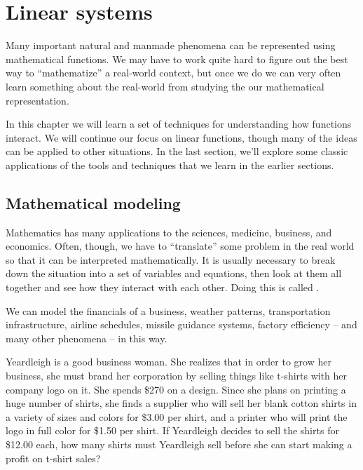 \chapter{Linear systems}
\label{ch:systems}


Many important natural and manmade phenomena can be represented using mathematical functions. We may have to work quite hard to figure out the best way to ``mathematize'' a real-world context, but once we do we can very often learn something about the real-world from studying the our mathematical representation.

In this chapter we will learn a set of techniques for understanding how functions interact. We will continue our focus on linear functions, though many of the ideas can be applied to other situations. In the last section, we'll explore some classic applications of the tools and techniques that we learn in the earlier sections.

\section{Mathematical modeling}
\label{sec:sysintro}

Mathematics has many applications to the sciences, medicine, business, and economics. Often, though, we have to ``translate'' some problem in the real world so that it can be interpreted mathematically. It is usually necessary to break down the situation into a set of variables and equations, then look at them all together and see how they interact with each other. Doing this is called .

We can model the financials of a business, weather patterns, transportation infrastructure, airline schedules, missile guidance systems, factory efficiency -- and many other phenomena -- in this way.

\begin{boxexplore}
Yeardleigh is a good business woman. She realizes that in order to grow her business, she must brand her corporation by selling things like t-shirts with her company logo on it. She spends \$270 on a design. Since she plans on printing a huge number of shirts, she finds a supplier who will sell her blank cotton shirts in a variety of sizes and colors for \$3.00 per shirt, and a printer who will print the logo in full color for \$1.50 per shirt. If Yeardleigh decides to sell the shirts for \$12.00 each, how many shirts must Yeardleigh sell before she can start making a profit on t-shirt sales?
\end{boxexplore}

